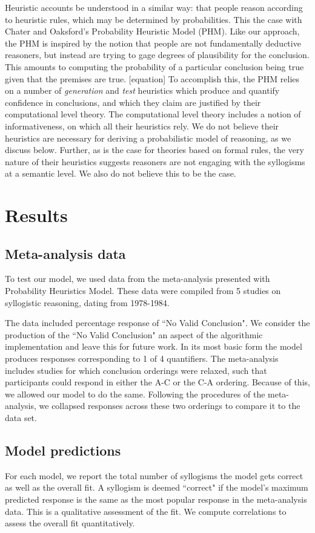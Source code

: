 \documentclass[10pt,letterpaper]{article}
\begin{document}
Heuristic accounts be understood in a similar way: that people reason according to heuristic rules, which may be determined by probabilities. This the case with Chater and Oaksford's Probability Heuristic Model (PHM). Like our approach, the PHM is inspired by the notion that people are not fundamentally deductive reasoners, but instead are trying to gage degrees of plausibility for the conclusion. This amounts to computing the probability of a particular conclusion being true given that the premises are true. [equation] To accomplish this, the PHM relies on a number of {\em generation} and {\em test} heuristics which produce and quantify confidence in conclusions, and which they claim are justified by their computational level theory. The computational level theory includes a notion of informativeness, on which all their heuristics rely. We do not believe their heuristics are necessary for deriving a probabilistic model of reasoning, as we discuss below. Further, as is the case for theories based on formal rules, the very nature of their heuristics suggests reasoners are not engaging with the syllogisms at a semantic level. We also do not believe this to be the case. 



\section{Results}

\subsection{Meta-analysis data}
To test our model, we used data from the meta-analysis presented with Probability Heuristics Model. These data were compiled from 5 studies on syllogistic reasoning, dating from 1978-1984. 

The data included percentage response of ``No Valid Conclusion". We consider the production of the ``No Valid Conclusion" an aspect of the algorithmic implementation and leave this for future work. In its most basic form the model produces responses corresponding to 1 of 4 quantifiers. The meta-analysis includes studies for which conclusion orderings were relaxed, such that participants could respond in either the A-C or the C-A ordering. Because of this, we allowed our model to do the same. Following the procedures of the meta-analysis, we collapsed responses across these two orderings to compare it to the data set.
\subsection{Model predictions}
For each model, we report the total number of syllogisms the model gets correct as well as the overall fit. A syllogism is deemed ``correct" if the model's maximum predicted response is the same as the most popular response in the meta-analysis data. This is a qualitative assessment of the fit. We compute correlations to assess the overall fit quantitatively. 
\end{document}
